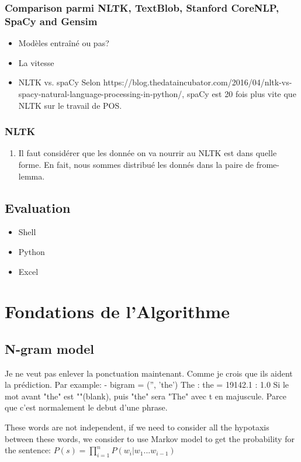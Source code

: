 \documentclass[a4paper]{article}
\begin{document}
\subsubsection{Comparison parmi NLTK, TextBlob, Stanford CoreNLP, SpaCy and Gensim}
\begin{itemize}
\item Modèles entraîné ou pas?
\item La vitesse
\item NLTK vs. spaCy  Selon https://blog.thedataincubator.com/2016/04/nltk-vs-spacy-natural-language-processing-in-python/, spaCy est 20 fois plus vite que NLTK sur le travail de POS.
\end{itemize}
\subsubsection{NLTK}
\begin{enumerate}
\item Il faut considérer que les donnée on va nourrir au NLTK est dans quelle forme. En fait, nous sommes distribué les donnés dans la paire de frome-lemma.
\end{enumerate}

\subsection{Evaluation}
\begin{itemize}
\item Shell
\item Python
\item Excel
\end{itemize}

\section{Fondations de l’Algorithme}
\subsection{N-gram model}
Je ne veut pas enlever la ponctuation maintenant. Comme je crois que ils aident la prédiction.  Par example:
- bigram = ('', 'the')       The : the    =  19142.1 : 1.0
Si le mot avant "the" est ""(blank), puis "the" sera "The" avec t en majuscule. Parce que c'est normalement le debut d'une phrase.

These words are not independent, if we need to consider all the hypotaxis between these words, we consider to use Markov model to get the probability for the sentence: $P(s)=\prod\limits_{i=1}^{n}P(w_i|w_1...w_{i-1})$
\end{document}
